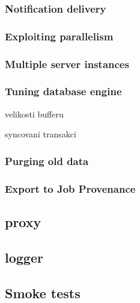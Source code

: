 \subsubsection{Notification delivery}

\subsubsection{Exploiting parallelism}

\subsubsection{Multiple server instances}

\subsubsection{Tuning database engine}


velikosti bufferu

syncovani transakci

\subsubsection{Purging old data}


\subsubsection{Export to Job Provenance}


\subsection{\LB proxy}

\subsection{\LB logger}


\subsection{Smoke tests}

